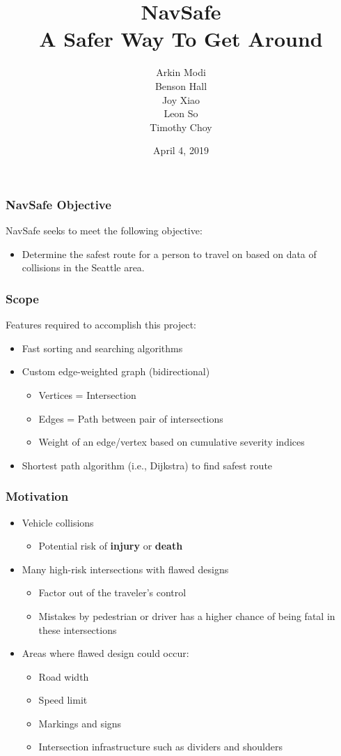 \documentclass[t,12pt,numbers,fleqn]{beamer}
\title{
    NavSafe\\
    \large A Safer Way To Get Around
}
\author{
    Arkin Modi\\
    Benson Hall\\
    Joy Xiao\\
    Leon So\\
    Timothy Choy
}
\institute{Department of Software and Computing, McMaster University}
\date{April 4, 2019}
\begin{document}
 
\frame{\titlepage}


\begin{frame}
\frametitle{NavSafe Objective}
NavSafe seeks to meet the following objective:
\begin{itemize}
    \item Determine the safest route for a person to travel on based on data of collisions in the Seattle area.
\end{itemize}
\end{frame}
 
\begin{frame}
\frametitle{Scope}
Features required to accomplish this project:
\begin{itemize}
    \item Fast sorting and searching algorithms
    \item Custom edge-weighted graph (bidirectional)
    \begin{itemize}
        \item[] Vertices = Intersection
        \item[] Edges = Path between pair of intersections
        \item[] Weight of an edge/vertex based on cumulative severity indices 
    \end{itemize}
    \item Shortest path algorithm (i.e., Dijkstra) to find safest route
\end{itemize}

\end{frame}
\begin{frame}
\frametitle{Motivation}
\begin{itemize}
    \item Vehicle collisions
    \begin{itemize}
        \item Potential risk of \textbf{injury} or \textbf{death}
    \end{itemize}
    \item Many high-risk intersections with flawed designs
    \begin{itemize}
        \item Factor out of the traveler’s control
        \item Mistakes by pedestrian or driver has a higher chance of being fatal in these intersections
    \end{itemize}
    \item Areas where flawed design could occur:
    \begin{itemize}
        \item Road width
        \item Speed limit
        \item Markings and signs
        \item Intersection infrastructure such as dividers and shoulders
    \end{itemize}
\end{itemize}
\end{frame}
\end{document}
